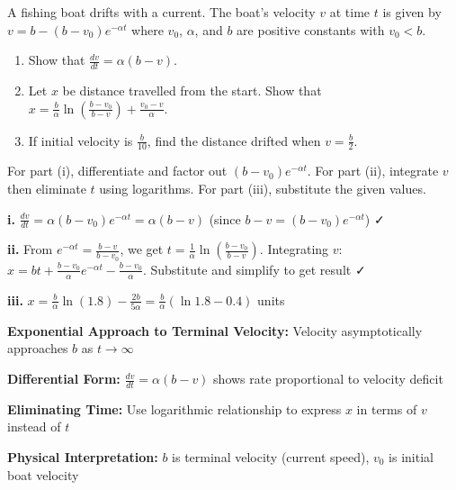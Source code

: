 \begin{problem}
A fishing boat drifts with a current. The boat's velocity $v$ at time $t$ is given by $v = b - (b - v_0)e^{-\alpha t}$ where $v_0$, $\alpha$, and $b$ are positive constants with $v_0 < b$.
\begin{enumerate}[label=\textbf{\roman*.}]
    \item Show that $\frac{dv}{dt} = \alpha(b - v)$.
    \item Let $x$ be distance travelled from the start. Show that $x = \frac{b}{\alpha}\ln\left(\frac{b - v_0}{b - v}\right) + \frac{v_0 - v}{\alpha}$.
    \item If initial velocity is $\frac{b}{10}$, find the distance drifted when $v = \frac{b}{2}$.
\end{enumerate}
\end{problem}

\begin{hint}
For part (i), differentiate and factor out $(b-v_0)e^{-\alpha t}$. For part (ii), integrate $v$ then eliminate $t$ using logarithms. For part (iii), substitute the given values.
\end{hint}

\begin{solution}
\textbf{i.} $\frac{dv}{dt} = \alpha(b-v_0)e^{-\alpha t} = \alpha(b-v)$ (since $b-v = (b-v_0)e^{-\alpha t}$) ✓

\textbf{ii.} From $e^{-\alpha t} = \frac{b-v}{b-v_0}$, we get $t = \frac{1}{\alpha}\ln\left(\frac{b-v_0}{b-v}\right)$. Integrating $v$: $x = bt + \frac{b-v_0}{\alpha}e^{-\alpha t} - \frac{b-v_0}{\alpha}$. Substitute and simplify to get result ✓

\textbf{iii.} $x = \frac{b}{\alpha}\ln(1.8) - \frac{2b}{5\alpha} = \frac{b}{\alpha}(\ln 1.8 - 0.4)$ units
\end{solution}

\begin{takeaways}
\item \textbf{Exponential Approach to Terminal Velocity:} Velocity asymptotically approaches $b$ as $t \to \infty$
\item \textbf{Differential Form:} $\frac{dv}{dt} = \alpha(b-v)$ shows rate proportional to velocity deficit
\item \textbf{Eliminating Time:} Use logarithmic relationship to express $x$ in terms of $v$ instead of $t$
\item \textbf{Physical Interpretation:} $b$ is terminal velocity (current speed), $v_0$ is initial boat velocity
\end{takeaways}

